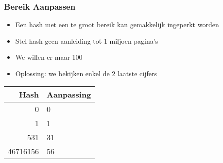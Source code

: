 \documentclass[dutch]{ucll-slides}
\begin{document}
\begin{frame}
  \frametitle{Bereik Aanpassen}
  \begin{itemize}
    \item Een hash met een te groot bereik kan gemakkelijk ingeperkt worden
    \item Stel hash geen aanleiding tot 1 miljoen pagina's
    \item We willen er maar 100
    \item Oplossing: we bekijken enkel de 2 laatste cijfers
  \end{itemize}
  \begin{center}
    \begin{tabular}{r@{$\;\rightarrow\;$}l}
      \bfseries Hash & \bfseries Aanpassing \\
      \toprule
      0 & 0 \\
      1 & 1 \\
      531 & 31 \\
      46716156 & 56 \\
    \end{tabular}
  \end{center}
\end{frame}
\end{document}
